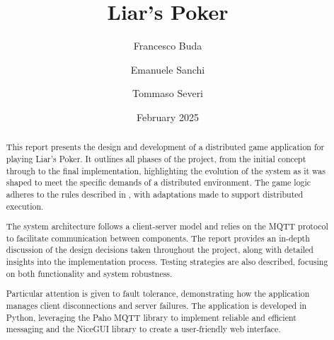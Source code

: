 \documentclass{scrartcl}
\title{\LARGE
    Liar's Poker
}
\author{
    Francesco Buda \\ \emailaddr{francesco.buda3@studio.unibo.it}
    \and
    Emanuele Sanchi \\ \emailaddr{emanuele.sanchi@studio.unibo.it}
    \and
    Tommaso Severi \\ \emailaddr{tommaso.severi2@studio.unibo.it}
}
\date{February 2025}
\begin{document}
\maketitle

\begin{abstract}
This report presents the design and development of a distributed game application for playing Liar's 
Poker. It outlines all phases of the project, from the initial concept through to the final 
implementation, highlighting the evolution of the system as it was shaped to meet the specific 
demands of a distributed environment. The game logic adheres to the rules described in 
\cite{gamerules}, with adaptations made to support distributed execution.

The system architecture follows a client-server model and relies on the MQTT protocol to facilitate 
communication between components. The report provides an in-depth discussion of the design decisions 
taken throughout the project, along with detailed insights into the implementation process. Testing 
strategies are also described, focusing on both functionality and system robustness.

Particular attention is given to fault tolerance, demonstrating how the application manages client 
disconnections and server failures. The application is developed in Python, leveraging the Paho MQTT 
library to implement reliable and efficient messaging and the NiceGUI library to create a 
user-friendly web interface.
\end{abstract}

\clearpage

\tableofcontents

\clearpage
\end{document}
